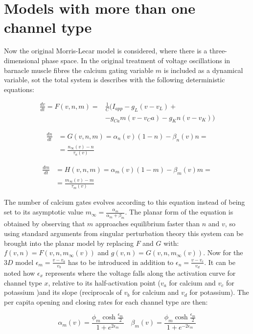 \section{Models with more than one channel type}
Now the original Morris-Lecar model is considered, where there is a three-dimensional phase space.
In the original treatment of voltage oscillations  in barnacle muscle fibres the calcium gating variable $m$ is included as a dynamical variable, sot the total system is describes with the following deterministic equations:

\begin{align*}
	\frac{dv}{dt} = F(v, n, m) =&\frac{1}{C}(I_{app}-g_L(v-v_L)+\\
															&-g_{Ca}m(v-v_Ca)-g_Kn(v-v_K))
\end{align*}

\begin{align*}
	\frac{dn}{dt} &= G(v, n, m) = \alpha_n(v)(1-n)-\beta_n(v)n=\\
								&=\frac{n_{\infty}(v)-n}{\tau_n(v)}
\end{align*}

\begin{align*}
	\frac{dm}{dt} &= H(v, n, m) = \alpha_m(v)(1-m)-\beta_m(v)m=\\
								&=\frac{m_\infty(v)-m}{\tau_m(v)}
\end{align*}

The number of calcium gates evolves according to this equation instead of being set to its asymptotic value $m_\infty = \frac{\alpha_m}{\alpha_m+\beta_m}$.
The planar form of the equation is obtained by observing that $m$ approaches equilibrium faster than $n$ and $v$, so using standard arguments from singular perturbation theory this system can be brought into the planar model by replacing $F$ and $G$ with: $f(v, n) = F(v, n, m_\infty(v))$ and $g(v, n) = G(v, n, m_\infty(v))$.
Now for the $3D$ model $\epsilon_m = \frac{v-v_a}{v_b}$ has to be introduced in addition to $\epsilon_n = \frac{v-v_c}{v_d}$.
It can be noted how $\epsilon_x$ represents where the voltage falls along the activation curve for channel type $x$, relative to its half-activation point ($v_a$ for calcium and $v_c$ for potassium )and its slope (reciprocals of $v_b$ for calcium and $v_d$ for potassium).
The per capita opening and closing rates for each channel type are then:

$$\alpha_m(v) = \frac{\phi_m\cosh\frac{\epsilon_m}{2}}{1+e^{2\epsilon_m}}\quad\beta_m(v) = \frac{\phi_m\cosh\frac{\epsilon_m}{2}}{1+e^{-2\epsilon_m}}$$

